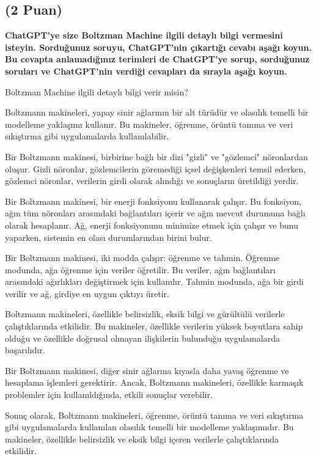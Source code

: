 \documentclass[11pt]{article}
\begin{document}
\subsection{(2 Puan)} \textbf{ChatGPT’ye size Boltzman Machine ilgili detaylı bilgi vermesini isteyin. Sorduğunuz soruyu, ChatGPT'nin çıkartığı cevabı aşağı koyun. Bu cevapta anlamadığınız terimleri de ChatGPT’ye sorup, sorduğunuz soruları ve ChatGPT’nin verdiği cevapları da sırayla aşağı koyun.}

Boltzman Machine ilgili detaylı bilgi verir misin?

Boltzmann makineleri, yapay sinir ağlarının bir alt türüdür ve olasılık temelli bir modelleme yaklaşımı kullanır. Bu makineler, öğrenme, örüntü tanıma ve veri sıkıştırma gibi uygulamalarda kullanılabilir.

Bir Boltzmann makinesi, birbirine bağlı bir dizi "gizli" ve "gözlemci" nöronlardan oluşur. Gizli nöronlar, gözlemcilerin göremediği içsel değişkenleri temsil ederken, gözlemci nöronlar, verilerin girdi olarak alındığı ve sonuçların üretildiği yerdir.

Bir Boltzmann makinesi, bir enerji fonksiyonu kullanarak çalışır. Bu fonksiyon, ağın tüm nöronları arasındaki bağlantıları içerir ve ağın mevcut durumuna bağlı olarak hesaplanır. Ağ, enerji fonksiyonunu minimize etmek için çalışır ve bunu yaparken, sistemin en olası durumlarından birini bulur.

Bir Boltzmann makinesi, iki modda çalışır: öğrenme ve tahmin. Öğrenme modunda, ağa öğrenme için veriler öğretilir. Bu veriler, ağın bağlantıları arasındaki ağırlıkları değiştirmek için kullanılır. Tahmin modunda, ağa bir girdi verilir ve ağ, girdiye en uygun çıktıyı üretir.

Boltzmann makineleri, özellikle belirsizlik, eksik bilgi ve gürültülü verilerle çalıştıklarında etkilidir. Bu makineler, özellikle verilerin yüksek boyutlara sahip olduğu ve özellikle doğrusal olmayan ilişkilerin bulunduğu uygulamalarda başarılıdır.

Bir Boltzmann makinesi, diğer sinir ağlarına kıyasla daha yavaş öğrenme ve hesaplama işlemleri gerektirir. Ancak, Boltzmann makineleri, özellikle karmaşık problemler için kullanıldığında, etkili sonuçlar verebilir.

Sonuç olarak, Boltzmann makineleri, öğrenme, örüntü tanıma ve veri sıkıştırma gibi uygulamalarda kullanılan olasılık temelli bir modelleme yaklaşımıdır. Bu makineler, özellikle belirsizlik ve eksik bilgi içeren verilerle çalıştıklarında etkilidir.
\end{document}
